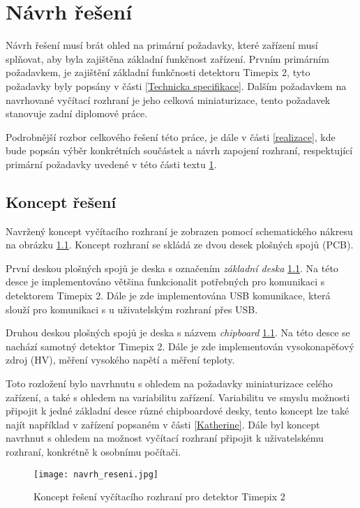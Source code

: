 \chapter{Návrh řešení} %
\label{Koncept reseni}
Návrh řešení musí brát ohled na primární požadavky, které zařízení musí splňovat, aby byla zajištěna základní funkčnost zařízení. Prvním primárním požadavkem, je zajištění základní funkčnosti detektoru Timepix 2, tyto požadavky byly popsány v části \ref{Technicka specifikace}. Dalším požadavkem na navrhované vyčítací rozhraní je jeho celková miniaturizace, tento požadavek stanovuje zadní diplomové práce.
\par Podrobnější rozbor celkového řešení této práce, je dále v části \ref{realizace}, kde bude popsán výběr konkrétních součástek a návrh zapojení rozhraní, respektující primární požadavky uvedené v této části textu \ref{Koncept reseni}.

\section{Koncept řešení}
Navržený koncept vyčítacího rozhraní je zobrazen pomocí schematického nákresu na obrázku \ref{fig:navrh_reseni}. Koncept rozhraní se skládá ze dvou desek plošných spojů (PCB). 
\par První deskou plošných spojů je deska s označením \textit{základní deska} \ref{fig:navrh_reseni}. Na této desce je implementováno většina funkcionalit potřebných pro komunikaci s detektorem Timepix 2. Dále je zde implementována USB komunikace, která slouží pro komunikaci s u  uživatelským rozhraní přes USB.
\par Druhou deskou plošných spojů je deska s názvem \textit{chipboard} \ref{fig:navrh_reseni}. Na této desce se nachází samotný detektor Timepix 2. Dále je zde implementován vysokonapěťový zdroj (HV), měření vysokého napětí a měření teploty.

Toto rozložení bylo navrhnutu s ohledem na požadavky miniaturizace celého zařízení, a také s ohledem na variabilitu zařízení. Variabilitu ve smyslu možnosti připojit k jedné základní desce různé chipboardové desky, tento koncept lze také najít například v zařízení popsaném v části \ref{Katherine}. Dále byl koncept navrhnut s ohledem na možnost vyčítací rozhraní připojit k uživatelskému rozhraní, konkrétně k osobnímu počítači.  

\begin{figure}[h!]
	\centering
	\captionsetup{justification=centering}
	\texttt{[image: navrh\_reseni.jpg]}
	\caption{Koncept řešení vyčítacího rozhraní pro detektor Timepix 2} 
	\label{fig:navrh_reseni}
\end{figure}

